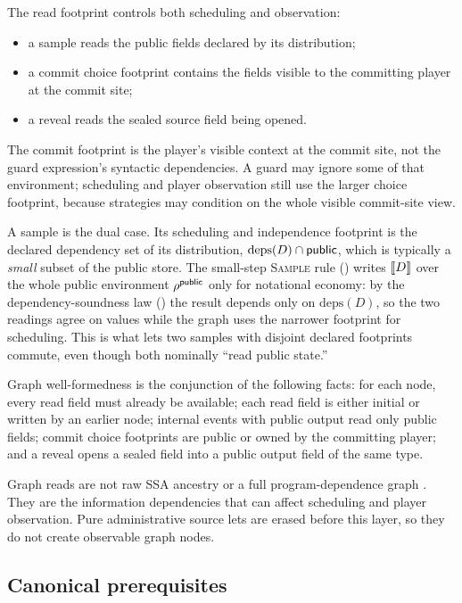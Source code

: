 The read footprint controls both scheduling and observation:
\begin{itemize}\itemsep1pt
\item a sample reads the public fields declared by its distribution;
\item a commit choice footprint contains the fields visible to the
  committing player at the commit site;
\item a reveal reads the sealed source field being opened.
\end{itemize}

The commit footprint is the player's visible context at the commit site,
not the guard expression's syntactic dependencies.  A guard may ignore
some of that environment; scheduling and player observation still use the
larger choice footprint, because strategies may condition on the whole
visible commit-site view.

A sample is the dual case.  Its scheduling and independence footprint is the
declared dependency set of its distribution, $\mathrm{deps}(D)\cap\mathsf{public}$, which
is typically a \emph{small} subset of the public store.  The small-step
\textsc{Sample} rule () writes $\llbracket D \rrbracket$ over the whole
public environment $\rho^{\mathsf{public}}$ only for notational economy: by the
dependency-soundness law () the result depends only
on $\mathrm{deps}(D)$, so the two readings agree on values while the graph uses
the narrower footprint for scheduling.  This is what lets two samples with
disjoint declared footprints commute, even though both nominally ``read public
state.''

Graph well-formedness is the conjunction of the following facts: for
each node, every read field must already be available; each read field
is either initial or written by an earlier node; internal events with
public output read only public fields; commit choice footprints are
public or owned by the committing player; and a reveal opens a sealed
field into a public output field of the same type.

Graph reads are not raw SSA ancestry or a full program-dependence graph
\citep{ferrante1987program}.  They are the information dependencies that
can affect scheduling and player observation.  Pure administrative
source lets are erased before this layer, so they do not create
observable graph nodes.

\subsection{Canonical prerequisites}
\label{sec:eg:prereqs}

